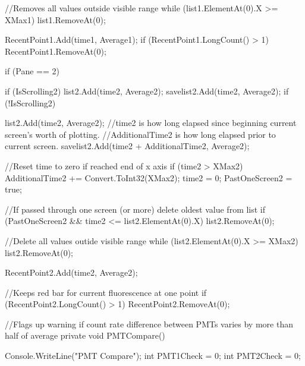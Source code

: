 {{{{{                    //Removes all values outside visible range
                    while (list1.ElementAt(0).X >= XMax1)
                    {
                        list1.RemoveAt(0);
                    }
                }

                RecentPoint1.Add(time1, Average1);
                if (RecentPoint1.LongCount() > 1)
                {
                    RecentPoint1.RemoveAt(0);
                }
            }

            if (Pane == 2)
            {
                if (IsScrolling2)
                {
                    list2.Add(time2, Average2);
                    savelist2.Add(time2, Average2);
                }
                if (!IsScrolling2)
                {
                    list2.Add(time2, Average2);
                    //time2 is how long elapsed since beginning current screen's worth of plotting.
                    //AdditionalTime2 is how long elapsed prior to current screen.
                    savelist2.Add(time2 + AdditionalTime2, Average2);
                    
                    //Reset time to zero if reached end of x axis
                    if (time2 > XMax2) 
                    {
                        AdditionalTime2 += Convert.ToInt32(XMax2);
                        time2 = 0;
                        PastOneScreen2 = true;
                    }

                    //If passed through one screen (or more) delete oldest value from list
                    if (PastOneScreen2 && time2 <= list2.ElementAt(0).X)
                    {
                        list2.RemoveAt(0);
                    }

                    //Delete all values outide visible range
                    while (list2.ElementAt(0).X >= XMax2)
                    {
                        list2.RemoveAt(0);
                    }
                }
                RecentPoint2.Add(time2, Average2);

                //Keeps red bar for current fluorescence at one point
                if (RecentPoint2.LongCount() > 1)
                {
                    RecentPoint2.RemoveAt(0);
                }
            }
        }

        //Flags up warning if count rate difference between PMTs varies by more than half of average
        private void PMTCompare()
        {
            Console.WriteLine("PMT Compare");
            int PMT1Check = 0;
            int PMT2Check = 0;
            
}}}
